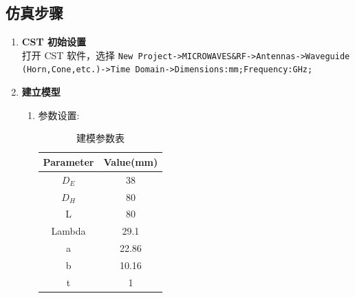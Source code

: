 \documentclass[12pt,a4paper,UTF8]{article}
\begin{document}
\subsection{仿真步骤}
\begin{enumerate}
    \item \textbf{CST 初始设置}\\
    打开 CST 软件，选择 \texttt{New Project->MICROWAVES\&RF->Antennas->Waveguide (Horn,Cone,etc.)->Time Domain->Dimensions:mm;Frequency:GHz;}
    
    \item \textbf{建立模型}
    \begin{enumerate}
        \item 参数设置:
        \begin{table}[ht]
        \centering
        \caption{建模参数表}
        \label{tab:param}
        \begin{tabular}{cc}
        \toprule
        Parameter & Value(mm) \\
        \midrule
        $D_E$ & 38 \\
        $D_H$ & 80 \\
        L & 80 \\
        Lambda & 29.1 \\
        a & 22.86 \\
        b & 10.16 \\
        t & 1 \\
        \bottomrule
        \end{tabular}
        \end{table}
        

\end{enumerate}
\end{enumerate}
\end{document}
